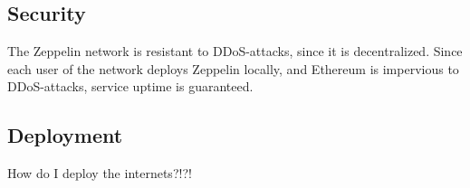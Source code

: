 \subsection{Security}
The Zeppelin network is resistant to DDoS-attacks, since it is decentralized. Since each user of the network deploys Zeppelin locally, and Ethereum is impervious to DDoS-attacks, service uptime is guaranteed.

\subsection{Deployment}
How do I deploy the internets?!?!

